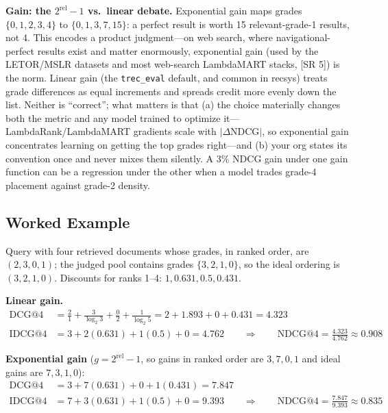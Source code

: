 \textbf{Gain: the $2^{\mathrm{rel}}-1$ vs.\ linear debate.} Exponential gain maps grades $\{0,1,2,3,4\}$ to $\{0,1,3,7,15\}$: a perfect result is worth 15 relevant-grade-1 results, not 4. This encodes a product judgment---on web search, where navigational-perfect results exist and matter enormously, exponential gain (used by the LETOR/MSLR datasets and most web-search LambdaMART stacks, [SR 5]) is the norm. Linear gain (the \texttt{trec\_eval} default, and common in recsys) treats grade differences as equal increments and spreads credit more evenly down the list. Neither is ``correct''; what matters is that (a) the choice materially changes both the metric and any model trained to optimize it---LambdaRank/LambdaMART gradients scale with $|\Delta \mathrm{NDCG}|$, so exponential gain concentrates learning on getting the top grades right---and (b) your org states its convention once and never mixes them silently. A 3\% NDCG gain under one gain function can be a regression under the other when a model trades grade-4 placement against grade-2 density.

\subsection{Worked Example}

Query with four retrieved documents whose grades, in ranked order, are $(2, 3, 0, 1)$; the judged pool contains grades $\{3, 2, 1, 0\}$, so the ideal ordering is $(3, 2, 1, 0)$. Discounts for ranks 1--4: $1, 0.631, 0.5, 0.431$.

\textbf{Linear gain.}
\begin{align}
\mathrm{DCG@}4 &= \frac{2}{1} + \frac{3}{\log_2 3} + \frac{0}{2} + \frac{1}{\log_2 5} = 2 + 1.893 + 0 + 0.431 = 4.323\\
\mathrm{IDCG@}4 &= 3 + 2(0.631) + 1(0.5) + 0 = 4.762
\qquad\Rightarrow\qquad \mathrm{NDCG@}4 = \frac{4.323}{4.762} \approx 0.908
\end{align}

\textbf{Exponential gain} ($g = 2^{\mathrm{rel}}-1$, so gains in ranked order are $3, 7, 0, 1$ and ideal gains are $7, 3, 1, 0$):
\begin{align}
\mathrm{DCG@}4 &= 3 + 7(0.631) + 0 + 1(0.431) = 7.847\\
\mathrm{IDCG@}4 &= 7 + 3(0.631) + 1(0.5) + 0 = 9.393
\qquad\Rightarrow\qquad \mathrm{NDCG@}4 = \frac{7.847}{9.393} \approx 0.835
\end{align}

